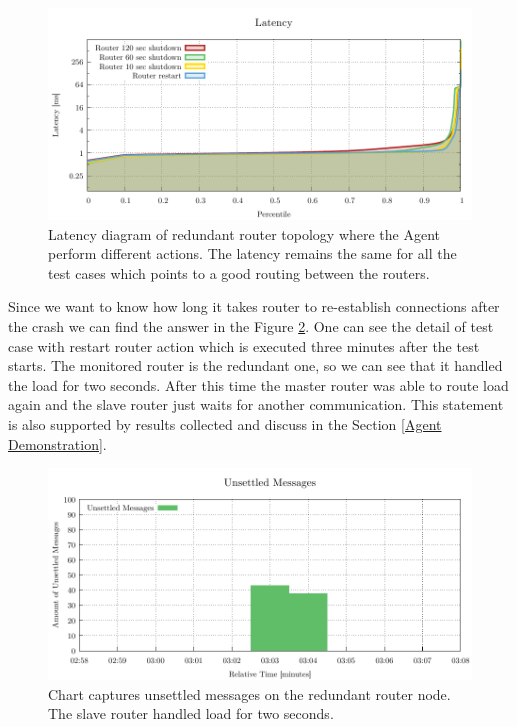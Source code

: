 \begin{figure}[H]
	\centering
	\includegraphics[width=1\linewidth]{obrazky-figures/charts/agent-redundant-latency.pdf}
	\caption{Latency diagram of redundant router topology where the Agent perform different actions. The latency remains the same for all the test cases which points to a good routing between the routers.}
	\label{fig:agent-redundant-latency}
\end{figure}

Since we want to know how long it takes router to re-establish connections after the crash we can find the answer in the Figure \ref{fig:agent-redundant-unpressetled}. One can see the detail of test case with restart router action which is executed three minutes after the test starts. The monitored router is the redundant one, so we can see that it handled the load for two seconds. After this time the master router was able to route load again and the slave router just waits for another communication. This statement is also supported by results collected and discuss in the Section \ref{Agent Demonstration}.

\begin{figure}[H]
	\centering
	\includegraphics[width=1\linewidth]{obrazky-figures/charts/restart-redundant-agent-routerLink.pdf}
	\caption{Chart captures unsettled messages on the redundant router node. The slave router handled load for two seconds.}
	\label{fig:agent-redundant-unpressetled}
\end{figure}

